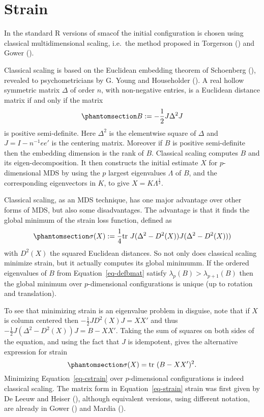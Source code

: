 \documentclass[
  12pt,
  letterpaper,
  DIV=11,
  numbers=noendperiod]{scrartcl}
\newcommand{\sectionbreak}{\clearpage}
\begin{document}
\sectionbreak

\section{Strain}\label{strain}

In the standard R versions of smacof the initial configuration is chosen
using classical multidimensional scaling, i.e.~the method proposed in
Torgerson () and Gower
().

Classical scaling is based on the Euclidean embedding theorem of
Schoenberg (), revealed to
psychometricians by G. Young and Householder
(). A real hollow symmetric
matrix \(\Delta\) of order \(n\), with non-negative entries, is a
Euclidean distance matrix if and only if the matrix
\begin{equation}\phantomsection\label{eq-defbmat}{
B:=-\frac12 J\Delta^2J
}\end{equation} is positive semi-definite. Here \(\Delta^2\) is the
elementwise square of \(\Delta\) and \(J=I-n^{-1}ee'\) is the centering
matrix. Moreover if \(B\) is positive semi-definite then the embedding
dimension is the rank of \(B\). Classical scaling computes \(B\) and its
eigen-decomposition. It then constructs the initial estimate \(X\) for
\(p\)-dimensional MDS by using the \(p\) largest eigenvalues \(\Lambda\)
of \(B\), and the corresponding eigenvectors in \(K\), to give
\(X=K\Lambda^\frac12\).

Classical scaling, as an MDS technique, has one major advantage over
other forms of MDS, but also some disadvantages. The advantage is that
it finds the global minimum of the strain loss function, defined as
\begin{equation}\phantomsection\label{eq-strain}{
\sigma(X):=\frac14\text{tr}\ J(\Delta^2-D^2(X))J(\Delta^2-D^2(X)))
}\end{equation} with \(D^2(X)\) the squared Euclidean distances. So not
only does classical scaling minimize strain, but it actually computes
its global minimumm. If the ordered eigenvalues of \(B\) from
Equation~\ref{eq-defbmat} satisfy \(\lambda_p(B)>\lambda_{p+1}(B)\) then
the global minimum over \(p\)-dimensional configurations is unique (up
to rotation and translation).

To see that minimizing strain is an eigenvalue problem in disguise, note
that if \(X\) is column centered then \(-\frac12JD^2(X)J=XX'\) and thus
\(-\frac12J(\Delta^2-D^2(X))J=B-XX'\). Taking the sum of squares on both
sides of the equation, and using the fact that \(J\) is idempotent,
gives the alternative expression for strain
\begin{equation}\phantomsection\label{eq-cstrain}{
\sigma(X)=\text{tr}\ (B-XX')^2.
}\end{equation} Minimizing Equation~\ref{eq-cstrain} over
\(p\)-dimensional configurations is indeed classical scaling. The matrix
form in Equation~\ref{eq-strain} strain was first given by De Leeuw and
Heiser (), although equivalent
versions, using different notation, are already in Gower
() and Mardia
().
\end{document}
